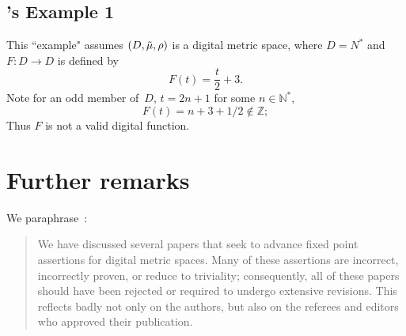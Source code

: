 \documentclass{article}
\numberwithin{thm}{section}
\def\Z{{\mathbb Z}}
\def\N{{\mathbb N}}
\begin{document}
\subsection{\cite{ShaheenEtAl}'s Example 1}
This ``example" assumes
$(D,\Tilde{\mu}, \rho)$ is a
digital metric space,
where $D=N^*$ and
$F: D \to D$ is defined by
\[ F(t) = \frac{t}{2} + 3. 
\]
Note for an odd member of~$D$, $t=2n+1$ for some $n \in \N^*$,
        \[ F(t) = n +3 + 1/2
           \not \in \Z;
        \]
        Thus $F$ is not a 
        valid digital function.

\section{Further remarks}
We paraphrase~\cite{BxBad8}:
\begin{quote}
We have discussed several papers that seek to advance
fixed point assertions for digital metric spaces.
Many of these assertions are incorrect, incorrectly proven, 
or reduce to triviality; consequently, all of these
papers should have been rejected or required to undergo
extensive revisions. This reflects badly not only on
the authors, but also on the referees and editors who
approved their publication.
\end{quote}
\end{document}
